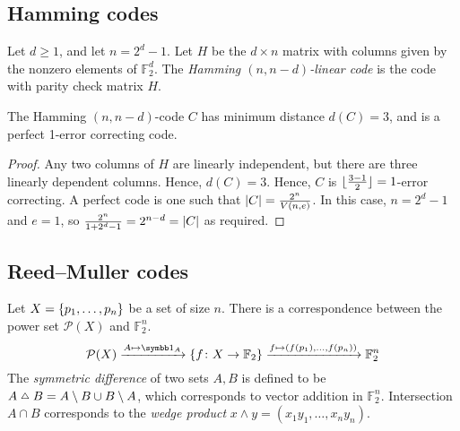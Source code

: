 \subsection{Hamming codes}
\begin{definition}
    Let \( d \geq 1 \), and let \( n = 2^d - 1 \).
    Let \( H \) be the \( d \times n \) matrix with columns given by the nonzero elements of \( \mathbb F_2^d \).
    The \emph{Hamming \( (n, n-d) \)-linear code} is the code with parity check matrix \( H \).
\end{definition}
\begin{lemma}
    The Hamming \( (n, n-d) \)-code \( C \) has minimum distance \( d(C) = 3 \), and is a perfect 1-error correcting code.
\end{lemma}
\begin{proof}
    Any two columns of \( H \) are linearly independent, but there are three linearly dependent columns.
    Hence, \( d(C) = 3 \).
    Hence, \( C \) is \( \lfloor\frac{3-1}{2}\rfloor = 1 \)-error correcting.
    A perfect code is one such that \( \abs{C} = \frac{2^n}{V(n,e)} \).
    In this case, \( n = 2^d - 1 \) and \( e = 1 \), so \( \frac{2^n}{1 + 2^d - 1} = 2^{n-d} = \abs{C} \) as required.
\end{proof}

\subsection{Reed--Muller codes}
Let \( X = \qty{p_1, \dots, p_n} \) be a set of size \( n \).
There is a correspondence between the power set \( \mathcal P(X) \) and \( \mathbb F_2^n \).
\[ \mathcal P(X) \xrightarrow{A \mapsto \symbb 1_A} \qty{f \colon X \to \mathbb F_2} \xrightarrow{f \mapsto (f(p_1), \dots, f(p_n))} \mathbb F_2^n \]
The \emph{symmetric difference} of two sets \( A, B \) is defined to be \( A \symmdiff B = A\setminus B \cup B \setminus A \), which corresponds to vector addition in \( \mathbb F_2^n \).
Intersection \( A \cap B \) corresponds to the \emph{wedge product} \( x \wedge y = (x_1 y_1, \dots, x_n y_n) \).

